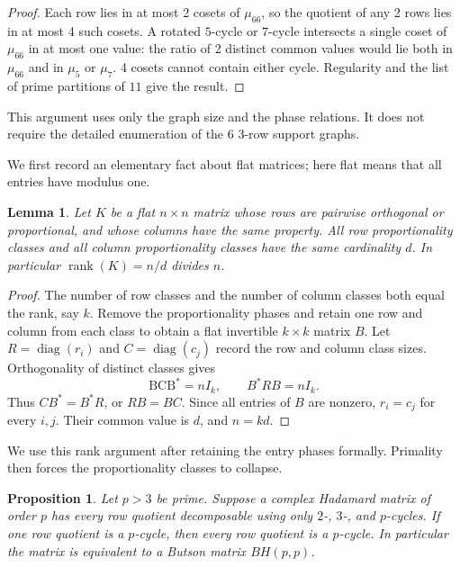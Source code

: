 \documentclass[11pt,a4paper]{article}
\newtheorem{proposition}[theorem]{Proposition}
\newtheorem{lemma}[theorem]{Lemma}
\theoremstyle{plain}
\theoremstyle{definition}
\theoremstyle{plain}
\begin{document}
\begin{proof}
Each row lies in at most 2 cosets of $\mu_{66}$, so the quotient of any 2 rows lies in at most 4 such cosets. A rotated $5$-cycle or $7$-cycle intersects a single coset of $\mu_{66}$ in at most one value: the ratio of 2 distinct common values would lie both in $\mu_{66}$ and in $\mu_5$ or $\mu_7$. 4 cosets cannot contain either cycle. Regularity and the list of prime partitions of $11$ give the result.
\end{proof}

This argument uses only the graph size and the phase relations. It does not require the detailed enumeration of the 6 3-row support graphs.

\medskip
We first record an elementary fact about flat matrices; here flat means that all entries have modulus one.

\par\addvspace{\medskipamount}\noindent
\begin{minipage}{\linewidth}
\begin{lemma}\label{n11_A_completion:blocks}
Let $K$ be a flat $n\times n$ matrix whose rows are pairwise orthogonal or proportional, and whose columns have the same property. All row proportionality classes and all column proportionality classes have the same cardinality $d$. In particular $\operatorname{rank}(K)=n/d$ divides $n$.
\end{lemma}
\end{minipage}
\par\addvspace{\medskipamount}

\begin{proof}
The number of row classes and the number of column classes both equal the rank, say $k$. Remove the proportionality phases and retain one row and column from each class to obtain a flat invertible $k\times k$ matrix $B$. Let $R=\operatorname{diag}(r_i)$ and $C=\operatorname{diag}(c_j)$ record the row and column class sizes. Orthogonality of distinct classes gives
$$\mathrm{BCB}^*=nI_k,\qquad B^*RB=nI_k.$$
Thus $CB^*=B^*R$, or $RB=BC$. Since all entries of $B$ are nonzero, $r_i=c_j$ for every $i,j$. Their common value is $d$, and $n=kd$.
\end{proof}

We use this rank argument after retaining the entry phases formally. Primality then forces the proportionality classes to collapse.

\par\addvspace{\medskipamount}\noindent
\begin{minipage}{\linewidth}
\begin{proposition}\label{n11_A_completion:rigidity}
Let $p>3$ be prime. Suppose a complex Hadamard matrix of order $p$ has every row quotient decomposable using only $2$-, $3$-, and $p$-cycles. If one row quotient is a $p$-cycle, then every row quotient is a $p$-cycle. In particular the matrix is equivalent to a Butson matrix $BH(p,p)$.
\end{proposition}
\end{minipage}
\par\addvspace{\medskipamount}
\end{document}
